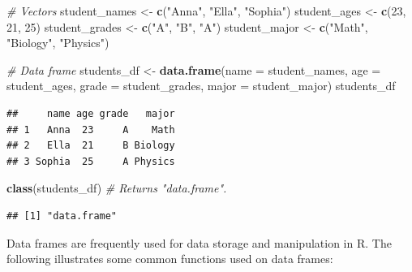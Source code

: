 \documentclass[
]{book}
\newenvironment{Shaded}{\begin{snugshade}}{\end{snugshade}}
\newcommand{\AttributeTok}[1]{\textcolor[rgb]{0.13,0.29,0.53}{#1}}
\newcommand{\CommentTok}[1]{\textcolor[rgb]{0.56,0.35,0.01}{\textit{#1}}}
\newcommand{\DecValTok}[1]{\textcolor[rgb]{0.00,0.00,0.81}{#1}}
\newcommand{\FunctionTok}[1]{\textcolor[rgb]{0.13,0.29,0.53}{\textbf{#1}}}
\newcommand{\NormalTok}[1]{#1}
\newcommand{\OtherTok}[1]{\textcolor[rgb]{0.56,0.35,0.01}{#1}}
\newcommand{\SpecialCharTok}[1]{\textcolor[rgb]{0.81,0.36,0.00}{\textbf{#1}}}
\newcommand{\StringTok}[1]{\textcolor[rgb]{0.31,0.60,0.02}{#1}}
\begin{document}
\begin{Shaded}
\begin{Highlighting}[]
\CommentTok{\# Vectors}
\NormalTok{student\_names }\OtherTok{\textless{}{-}} \FunctionTok{c}\NormalTok{(}\StringTok{"Anna"}\NormalTok{, }\StringTok{"Ella"}\NormalTok{, }\StringTok{"Sophia"}\NormalTok{)}
\NormalTok{student\_ages }\OtherTok{\textless{}{-}} \FunctionTok{c}\NormalTok{(}\DecValTok{23}\NormalTok{, }\DecValTok{21}\NormalTok{, }\DecValTok{25}\NormalTok{)}
\NormalTok{student\_grades }\OtherTok{\textless{}{-}} \FunctionTok{c}\NormalTok{(}\StringTok{"A"}\NormalTok{, }\StringTok{"B"}\NormalTok{, }\StringTok{"A"}\NormalTok{)}
\NormalTok{student\_major }\OtherTok{\textless{}{-}} \FunctionTok{c}\NormalTok{(}\StringTok{"Math"}\NormalTok{, }\StringTok{"Biology"}\NormalTok{, }\StringTok{"Physics"}\NormalTok{)}

\CommentTok{\# Data frame}
\NormalTok{students\_df }\OtherTok{\textless{}{-}} \FunctionTok{data.frame}\NormalTok{(}\AttributeTok{name =}\NormalTok{ student\_names, }
                          \AttributeTok{age =}\NormalTok{ student\_ages, }
                          \AttributeTok{grade =}\NormalTok{ student\_grades, }
                          \AttributeTok{major =}\NormalTok{ student\_major)}
\NormalTok{students\_df}
\end{Highlighting}
\end{Shaded}

\begin{verbatim}
##     name age grade   major
## 1   Anna  23     A    Math
## 2   Ella  21     B Biology
## 3 Sophia  25     A Physics
\end{verbatim}

\begin{Shaded}
\begin{Highlighting}[]
\FunctionTok{class}\NormalTok{(students\_df)  }\CommentTok{\# Returns "data.frame".}
\end{Highlighting}
\end{Shaded}

\begin{verbatim}
## [1] "data.frame"
\end{verbatim}

Data frames are frequently used for data storage and manipulation in R. The following illustrates some common functions used on data frames:

\begin{Shaded}
\end{Shaded}
\end{document}

